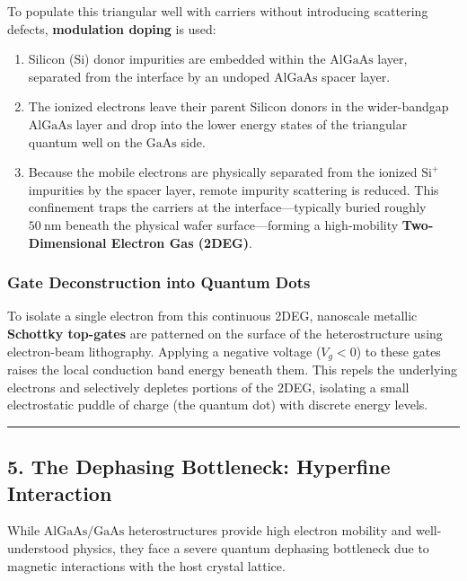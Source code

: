 \documentclass[
]{article}
\providecommand{\tightlist}{%
  \setlength{\itemsep}{0pt}\setlength{\parskip}{0pt}}
\begin{document}
To populate this triangular well with carriers without introducing
scattering defects, \textbf{modulation doping} is used:

\begin{enumerate}
\def\labelenumi{\arabic{enumi}.}
\tightlist
\item
  Silicon (\(\text{Si}\)) donor impurities are embedded within the
  \(\text{AlGaAs}\) layer, separated from the interface by an undoped
  \(\text{AlGaAs}\) spacer layer.
\item
  The ionized electrons leave their parent Silicon donors in the
  wider-bandgap \(\text{AlGaAs}\) layer and drop into the lower energy
  states of the triangular quantum well on the \(\text{GaAs}\) side.
\item
  Because the mobile electrons are physically separated from the ionized
  \(\text{Si}^+\) impurities by the spacer layer, remote impurity
  scattering is reduced. This confinement traps the carriers at the
  interface---typically buried roughly \(50\ \text{nm}\) beneath the
  physical wafer surface---forming a high-mobility
  \textbf{Two-Dimensional Electron Gas (2DEG)}.
\end{enumerate}

\subsubsection{Gate Deconstruction into Quantum
Dots}\label{gate-deconstruction-into-quantum-dots}

To isolate a single electron from this continuous 2DEG, nanoscale
metallic \textbf{Schottky top-gates} are patterned on the surface of the
heterostructure using electron-beam lithography. Applying a negative
voltage (\(V_g < 0\)) to these gates raises the local conduction band
energy beneath them. This repels the underlying electrons and
selectively depletes portions of the 2DEG, isolating a small
electrostatic puddle of charge (the quantum dot) with discrete energy
levels.

\begin{center}\rule{0.5\linewidth}{0.5pt}\end{center}

\subsection{5. The Dephasing Bottleneck: Hyperfine
Interaction}\label{the-dephasing-bottleneck-hyperfine-interaction}

While \(\text{AlGaAs/GaAs}\) heterostructures provide high electron
mobility and well-understood physics, they face a severe quantum
dephasing bottleneck due to magnetic interactions with the host crystal
lattice.
\end{document}
